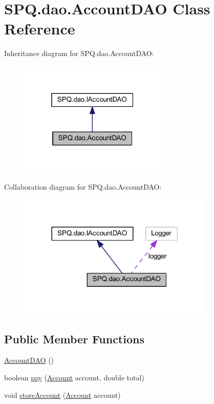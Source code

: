 \hypertarget{class_s_p_q_1_1dao_1_1_account_d_a_o}{}\section{S\+P\+Q.\+dao.\+Account\+D\+AO Class Reference}
\label{class_s_p_q_1_1dao_1_1_account_d_a_o}


Inheritance diagram for S\+P\+Q.\+dao.\+Account\+D\+AO\+:
\nopagebreak
\begin{figure}[H]
\begin{center}
\leavevmode
\includegraphics[width=199pt]{class_s_p_q_1_1dao_1_1_account_d_a_o__inherit__graph}
\end{center}
\end{figure}


Collaboration diagram for S\+P\+Q.\+dao.\+Account\+D\+AO\+:
\nopagebreak
\begin{figure}[H]
\begin{center}
\leavevmode
\includegraphics[width=264pt]{class_s_p_q_1_1dao_1_1_account_d_a_o__coll__graph}
\end{center}
\end{figure}
\subsection*{Public Member Functions}
\begin{DoxyCompactItemize}
\item 
\mbox{\hyperlink{class_s_p_q_1_1dao_1_1_account_d_a_o_a8de4c4bcd808ea5ea2b9fdbc741e49ea}{Account\+D\+AO}} ()
\item 
boolean \mbox{\hyperlink{class_s_p_q_1_1dao_1_1_account_d_a_o_ad40cd6129f180d4cb235c00756b53930}{pay}} (\mbox{\hyperlink{class_s_p_q_1_1data_1_1_account}{Account}} account, double total)
\item 
void \mbox{\hyperlink{class_s_p_q_1_1dao_1_1_account_d_a_o_abe750b9b11a2c7d398c4d8676b053f99}{store\+Account}} (\mbox{\hyperlink{class_s_p_q_1_1data_1_1_account}{Account}} account)
\end{DoxyCompactItemize}


